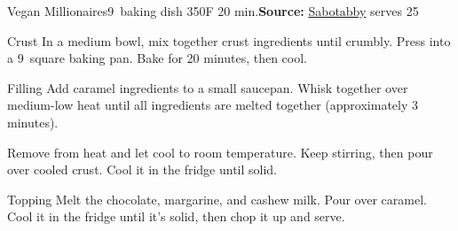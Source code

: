 \begin{recipe}{Vegan Millionaires}{9\inch{}\inch\ baking dish \hfill 350\0F \hfill 20 min.}{\textbf{Source:} \href{https://sabotabby.dreamwidth.org/2089568.html}{Sabotabby} \hfill serves 25}

\freeform Crust
  In a medium bowl, mix together crust ingredients until crumbly. Press into a 9\inch\ square baking pan. Bake for 20 minutes, then cool.

\freeform Filling
Add caramel ingredients to a small saucepan. Whisk together over medium-low heat until all ingredients are melted together (approximately 3 minutes).

\newstep Remove from heat and let cool to room temperature. Keep stirring, then pour over cooled crust. Cool it in the fridge until solid.

\freeform Topping
Melt the chocolate, margarine, and cashew milk. Pour over caramel. Cool it in the fridge until it’s solid, then chop it up and serve.
\end{recipe}